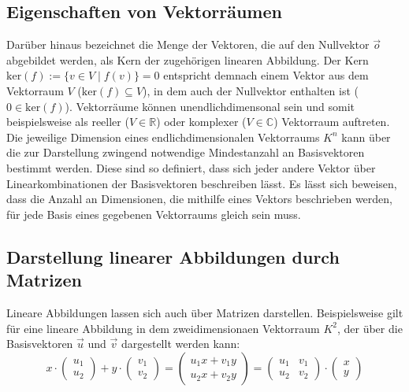 \documentclass[]{dsadokumentation}
\begin{document}
\subsection{Eigenschaften von Vektorräumen}
Darüber hinaus bezeichnet die Menge der Vektoren, die auf den Nullvektor $\vec{o}$ abgebildet werden, als Kern der zugehörigen linearen Abbildung. Der Kern $\mathrm{ker}(f):= \{v \in V \; \big\vert \; f(v) \} = 0$ entspricht demnach einem Vektor aus dem Vektorraum $V$ ($\mathrm{ker}(f) \subseteq V$), in dem auch der Nullvektor enthalten ist ($0 \in \mathrm{ker}(f)$). Vektorräume können unendlichdimensonal sein und somit beispielsweise als reeller ($V \in \mathbb{R}$) oder komplexer ($V \in \mathbb{C}$) Vektorraum auftreten. Die jeweilige Dimension eines endlichdimensionalen Vektorraums $K^n$ kann über die zur Darstellung zwingend notwendige Mindestanzahl an Basisvektoren bestimmt werden. Diese sind so definiert, dass sich jeder andere Vektor über Linearkombinationen der Basisvektoren beschreiben lässt. Es lässt sich beweisen, dass die Anzahl an Dimensionen, die mithilfe eines Vektors beschrieben werden, für jede Basis eines gegebenen Vektorraums gleich sein muss.

\subsection{Darstellung linearer Abbildungen durch Matrizen}
Lineare Abbildungen lassen sich auch über Matrizen darstellen. Beispielsweise gilt für eine lineare Abbildung in dem zweidimensionaen Vektorraum $K^2$, der über die Basisvektoren $\vec{u}$ und $\vec{v}$ dargestellt werden kann:
\[x \cdot \left(\begin{array}{c} u_1 \\ u_2 \end{array}\right) + y \cdot \left(\begin{array}{c} v_1 \\ v_2 \end{array}\right) = \left(\begin{array}{c} u_1 x + v_1 y \\ u_2 x + v_2 y \end{array}\right) = \left( \begin{array}{rr} u_1 & v_1 \\ u_2 & v_2 \end{array}\right) \cdot \left(\begin{array}{c} x \\ y \end{array}\right) \]
\end{document}
